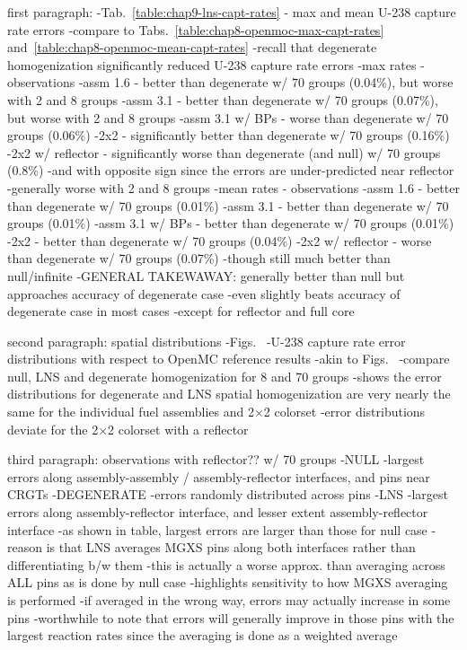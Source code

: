 first paragraph:
-Tab.~\ref{table:chap9-lns-capt-rates} - max and mean U-238 capture rate errors
  -compare to Tabs.~\ref{table:chap8-openmoc-max-capt-rates} and~\ref{table:chap8-openmoc-mean-capt-rates}
  -recall that degenerate homogenization significantly reduced U-238 capture rate errors 
-max rates - observations
  -assm 1.6 - better than degenerate w/ 70 groups (0.04\%), but worse with 2 and 8 groups
  -assm 3.1 - better than degenerate w/ 70 groups (0.07\%), but worse with 2 and 8 groups
  -assm 3.1 w/ BPs - worse than degenerate w/ 70 groups (0.06\%)
  -2x2 - significantly better than degenerate w/ 70 groups (0.16\%)
  -2x2 w/ reflector - significantly worse than degenerate (and null) w/ 70 groups (0.8\%)
    -and with opposite sign since the errors are under-predicted near reflector
  -generally worse with 2 and 8 groups
-mean rates - observations
  -assm 1.6 - better than degenerate w/ 70 groups (0.01\%)
  -assm 3.1 - better than degenerate w/ 70 groups (0.01\%)
  -assm 3.1 w/ BPs - better than degenerate w/ 70 groups (0.01\%)
  -2x2 - better than degenerate w/ 70 groups (0.04\%)
  -2x2 w/ reflector - worse than degenerate w/ 70 groups (0.07\%)
    -though still much better than null/infinite
-GENERAL TAKEWAWAY: generally better than null but approaches accuracy of degenerate case
  -even slightly beats accuracy of degenerate case in most cases
  -except for reflector and full core

second paragraph: spatial distributions
-Figs.~
  -U-238 capture rate error distributions with respect to OpenMC reference results
  -akin to Figs.~
  -compare null, \ac{LNS} and degenerate homogenization for 8 and 70 groups
  -shows the error distributions for degenerate and \ac{LNS} spatial homogenization are very nearly the same for the individual fuel assemblies and 2$\times$2 colorset
  -error distributions deviate for the 2$\times$2 colorset with a reflector

third paragraph: observations with reflector?? w/ 70 groups
  -NULL
    -largest errors along assembly-assembly / assembly-reflector interfaces, and pins near \acp{CRGT}
  -DEGENERATE
    -errors randomly distributed across pins
  -LNS
    -largest errors along assembly-reflector interface, and lesser extent assembly-reflector interface
    -as shown in table, largest errors are larger than those for null case
    -reason is that LNS averages \ac{MGXS} pins along both interfaces rather than differentiating b/w them
    -this is actually a worse approx. than averaging across ALL pins as is done by null case
    -highlights sensitivity to how \ac{MGXS} averaging is performed
      -if averaged in the wrong way, errors may actually increase in some pins
      -worthwhile to note that errors will generally improve in those pins with the largest reaction rates since the averaging is done as a weighted average

